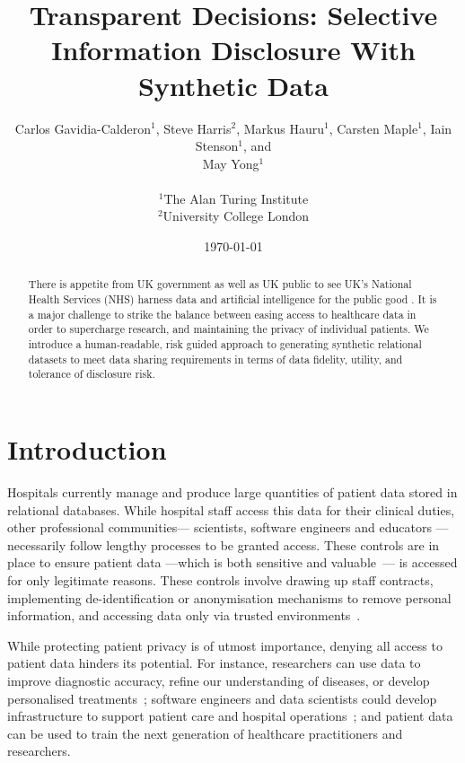 \documentclass[11pt]{article}
\begin{document}
\title{Transparent Decisions: Selective Information Disclosure With Synthetic Data}
\author{
Carlos Gavidia-Calderon$^1$, Steve Harris$^2$, Markus Hauru$^1$, Carsten Maple$^1$, Iain Stenson$^1$, and \\ May Yong$^1$ \\~\\
$^1$The Alan Turing Institute \\
$^2$University College London
}
\date{\today} %
\maketitle
\begin{abstract}
There is appetite from UK government as well as UK public to see UK's National Health Services (NHS) harness data and artificial intelligence for the public good \cite{gov2022datasaves}\cite{Jones2022}. It is a major challenge to strike the balance between easing access to healthcare data in order to supercharge research, and maintaining the privacy of individual patients. We introduce a human-readable, risk guided approach to generating synthetic relational datasets to meet data sharing requirements in terms of data fidelity, utility, and tolerance of disclosure risk.
\end{abstract}

\section{Introduction}

Hospitals currently manage and produce large quantities of
patient data stored in relational databases. While hospital staff access this data for their clinical duties, other professional communities--- scientists, software engineers and educators --- necessarily follow lengthy processes to be granted access. These controls are in place to ensure patient data ---which is both sensitive and valuable~\cite{schomerus2022}--- is accessed for only legitimate reasons.
These controls involve drawing up staff contracts, implementing de-identification or anonymisation mechanisms to remove personal information, and accessing data only via trusted environments~\cite{harris2022}.

While protecting patient privacy is of utmost importance, denying all access to 
patient data hinders its potential.
For instance, researchers can use data to improve diagnostic accuracy, refine our understanding of diseases, or develop personalised treatments~\cite{tucker2020}; software engineers and data scientists could develop infrastructure to support patient care and hospital operations~\cite{harris2022}; and patient data can be used to train the next generation of healthcare practitioners and researchers.
\end{document}
